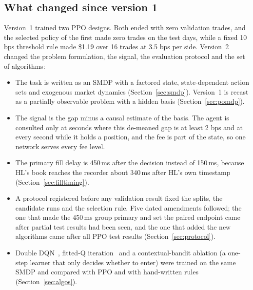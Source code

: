 \documentclass[12pt,a4paper]{article}
\DeclareRobustCommand{\bps}{\ifmmode\,\text{bps}\else\,bps\fi}
\newcommand{\usd}[1]{\$#1}
\begin{document}
\subsection{What changed since version 1}
Version~1 trained two PPO designs. Both ended with zero validation trades, and the selected
policy of the first made zero trades on the test days, while a fixed 10\bps{} threshold rule
made \usd{1.19} over 16 trades at 3.5\bps{} per side. Version~2 changed the problem
formulation, the signal, the evaluation protocol and the set of algorithms:
\begin{itemize}
\item The task is written as an SMDP with a factored state, state-dependent action sets and
exogenous market dynamics (Section~\ref{sec:smdp}). Version~1 is recast as a partially
observable problem with a hidden basis (Section~\ref{sec:pomdp}).
\item The signal is the gap minus a causal estimate of the basis. The agent is consulted only
at seconds where this de-meaned gap is at least 2\bps{} and at every second while it holds a
position, and the fee is part of the state, so one network serves every fee level.
\item The primary fill delay is 450\,ms after the decision instead of 150\,ms, because HL's
book reaches the recorder about 340\,ms after HL's own timestamp
(Section~\ref{sec:filltiming}).
\item A protocol registered before any validation result fixed the splits, the candidate runs
and the selection rule. Five dated amendments followed; the one that made the 450\,ms group
primary and set the paired endpoint came after partial test results had been seen, and the one
that added the new algorithms came after all PPO test results (Section~\ref{sec:protocol}).
\item Double DQN~\cite{ddqn}, fitted-Q iteration~\cite{ernst,nfq} and a contextual-bandit
ablation (a one-step learner that only decides whether to enter) were trained on the same SMDP
and compared with PPO and with hand-written rules (Section~\ref{sec:algos}).
\end{itemize}
\end{document}
